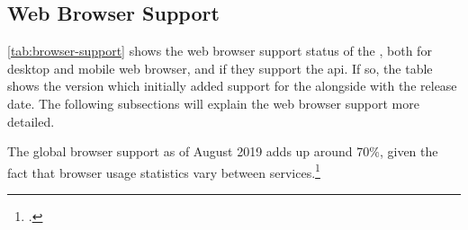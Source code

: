 \subsection{Web Browser Support}

\autoref{tab:browser-support} shows the web browser support status of the \wa{}, both for desktop and mobile web browser, and if they support the \gls{api}. If so, the table shows the version which initially added support for the \wa{} alongside with the release date. The following subsections will explain the web browser support more detailed.

The global browser support as of August 2019 adds up around 70\%, given the fact that browser usage statistics vary between services.\footcitetexts[The obtained data is available in the Appendix \autoref{sec:stats}, see][]{statcounter-global}

